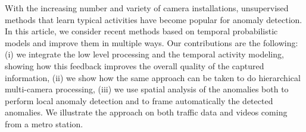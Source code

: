 
With the increasing number and variety of camera installations, unsupervised methods that learn typical activities have become popular for anomaly detection.
In this article, we consider recent methods based on temporal probabilistic models and improve them in multiple ways.
Our contributions are the following:
(i) we integrate the low level processing and the temporal activity modeling, showing how this feedback improves the overall quality of the captured information,
(ii) we show how the same approach can be taken to do hierarchical multi-camera processing,
(iii) we use spatial analysis of the anomalies both to perform local anomaly detection and to frame automatically the detected anomalies.
We illustrate the approach on both traffic data and videos coming from a metro station.

